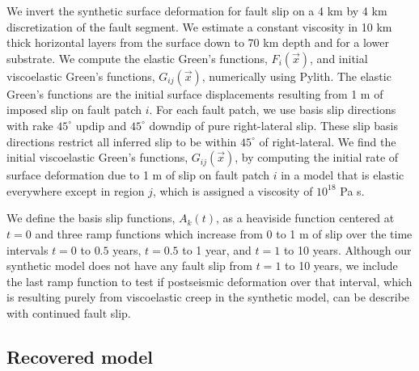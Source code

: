 \documentclass[extra]{gji}
\begin{document}
We invert the synthetic surface deformation for fault slip on a 4 km
by 4 km discretization of the fault segment.  We estimate a constant
viscosity in 10 km thick horizontal layers from the surface down to 70
km depth and for a lower substrate. We compute the elastic Green's
functions, $F_i(\vec{x})$, and initial viscoelastic Green's functions,
$G_{ij}(\vec{x})$, numerically using Pylith.  The elastic Green's
functions are the initial surface displacements resulting from 1 m of
imposed slip on fault patch $i$.  For each fault patch, we use basis
slip directions with rake $45^\circ$ updip and $45^\circ$ downdip of
pure right-lateral slip.  These slip basis directions restrict all
inferred slip to be within $45^\circ$ of right-lateral. We find the
initial viscoelastic Green's functions, $G_{ij}(\vec{x})$, by
computing the initial rate of surface deformation due to 1 m of slip
on fault patch $i$ in a model that is elastic everywhere except in
region $j$, which is assigned a viscosity of $10^{18}$ Pa s.

We define the basis slip functions, $A_k(t)$, as a heaviside function
centered at $t=0$ and three ramp functions which increase from 0 to 1
m of slip over the time intervals $t=0$ to $0.5$ years, $t=0.5$ to 1
year, and $t=1$ to 10 years.  Although our synthetic model does not
have any fault slip from $t=1$ to 10 years, we include the last
ramp function to test if postseismic deformation over that interval,
which is resulting purely from viscoelastic creep in the synthetic
model, can be describe with continued fault slip.

\subsection{Recovered model}
\end{document}
